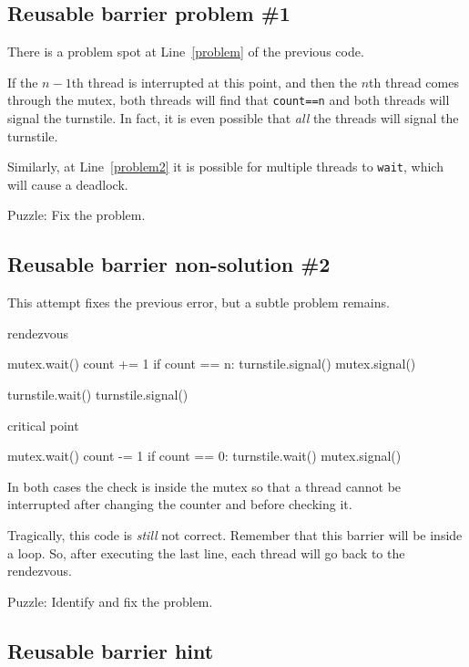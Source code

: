 \documentclass{book}
\begin{document}
\subsection {Reusable barrier problem \#1}

There is a problem spot at Line~\ref{problem} of the previous code.

If the $n-1$th thread is interrupted at this point,
and then the $n$th thread comes through the mutex,
both threads will find that {\tt count==n} and both
threads will signal the turnstile.  In fact, it is even
possible that {\em all} the threads will signal the turnstile.

Similarly, at Line~\ref{problem2} it is possible for multiple
threads to {\tt wait}, which will cause a deadlock.

Puzzle: Fix the problem.



\subsection {Reusable barrier non-solution \#2}

This attempt fixes the previous error, but a subtle problem
remains.

\begin{unbreakable}[title={Reusable barrier non-solution}]{}
rendezvous

mutex.wait()
    count += 1
    if count == n: turnstile.signal()
mutex.signal()

turnstile.wait()
turnstile.signal()

critical point

mutex.wait()
    count -= 1
    if count == 0: turnstile.wait()
mutex.signal()
\end{unbreakable}

In both cases the check is inside the mutex so that
a thread cannot be interrupted after changing the counter
and before checking it.

Tragically, this code is {\em still} not correct.
Remember that this barrier will be inside a loop.  So, after
executing the last line, each thread will go back
to the rendezvous.

Puzzle: Identify and fix the problem.



\subsection {Reusable barrier hint}
\end{document}
